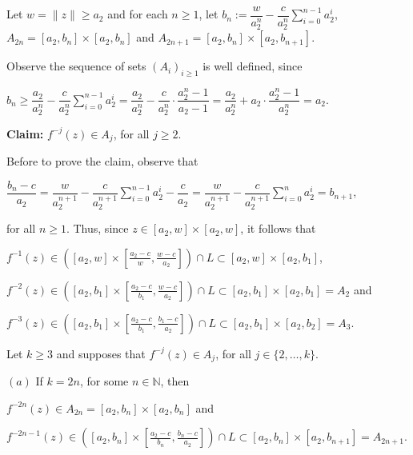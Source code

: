 \documentclass[11pt]{amsart}
\theoremstyle{definition}
\begin{document}
Let $w=\|z\|\geq a_2$ and for each $n\geq 1$, let $b_n:=\dfrac{w}{a_2^n}-\dfrac{c}{a_2^n}\displaystyle\sum_{i=0}^{n-1}a_2^i$, $A_{2n}=[a_2,b_n]\times[a_2,b_{n}]$ and
$A_{2n+1}=[a_2,b_{n}]\times[a_2,b_{n+1}]$.

Observe the sequence of sets $(A_i)_{i\geq 1}$ is well defined, since
\begin{center}
$b_n\geq \dfrac{a_2}{a_2^n}-\dfrac{c}{a_2^n}\displaystyle\sum_{i=0}^{n-1}a_2^i=\dfrac{a_2}{a_2^n}-\dfrac{c}{a_2^n}\cdot \dfrac{a_2^n-1}{a_2-1} =\dfrac{a_2}{a_2^n}+a_2\cdot\dfrac{a_2^n-1}{a_2^n}=a_2$.
\end{center}

\noindent \textbf{Claim:} $f^{-j}(z)\in A_j$, for all $j\geq 2$.

Before to prove the claim, observe that
\begin{center}
$\dfrac{b_n-c}{a_2}=\dfrac{w}{a_2^{n+1}}-\dfrac{c}{a_2^{n+1}}\displaystyle\sum_{i=0}^{n-1}a_2^i-\dfrac{c}{a_2}=\dfrac{w}{a_2^{n+1}}-\dfrac{c}{a_2^{n+1}}\displaystyle\sum_{i=0}^{n}a_2^i=b_{n+1}$,
\end{center}
 for all $n\geq 1$. Thus, since $z\in[a_2,w]\times[a_2,w]$, it follows that

\smallskip

\noindent	$f^{-1}(z)\in\left([a_2,w]\times\left[\frac{a_2-c}{w},\frac{w-c}{a_2}\right]\right)\cap L\subset [a_2,w]\times\left[a_2,b_1\right]$,

\noindent	$f^{-2}(z)\in\left(\left[a_2,b_1\right]\times\left[ \frac{a_2-c}{b_1},\frac{w-c}{a_2}\right]\right)\cap
	L\subset \left[a_2,b_1\right]\times\left[ a_2,b_1\right]=A_2$ and

\noindent	$f^{-3}(z)\in\left(\left[a_2,b_1\right]\times\left[ \frac{a_2-c}{b_1},\frac{b_1-c}{a_2}\right]\right)\cap
	L\subset \left[a_2,b_1\right]\times\left[ a_2,b_2\right]=A_3$.


Let $k\geq 3$ and supposes that $f^{-j}(z)\in A_j$, for all
$j\in\{2,\ldots,k\}$.

\smallskip

$(a)$ If $k=2n$, for some $n\in\mathbb{N}$, then

\smallskip

\noindent $f^{-2n}(z)\in A_{2n}=[a_2,b_n]\times[ a_2,b_{n}]$ and

\noindent $f^{-2n-1}(z)\in\left(\left[a_2,b_{n}\right]\times\left[ \frac{a_2-c}{b_{n}},\frac{b_n-c}{a_2}\right]\right)\cap L
 \subset [a_2,b_{n}]\times [ a_2,b_{n+1}]=A_{2n+1}$.

\smallskip
\end{document}
